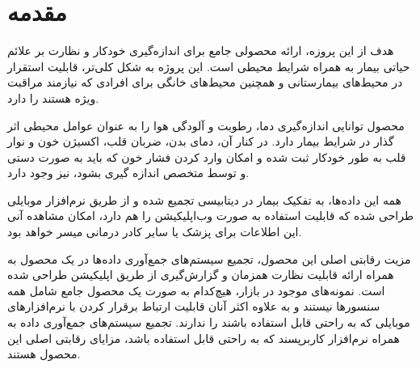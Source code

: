 \chapter{مقدمه}

هدف از این پروزه، ارائه محصولی جامع برای اندازه‌گیری خودکار و نظارت بر علائم حیاتی بیمار به همراه شرایط محیطی است. این پروژه به شکل کلی‌تر، قابلیت استقرار در محیط‌های بیمارستانی و همچنین محیط‌های خانگی برای افرادی که نیازمند مراقبت ویژه هستند را دارد.

محصول توانایی اندازه‌گیری دما،‌ رطوبت و آلودگی هوا را به عنوان عوامل محیطی اثر گذار در شرایط بیمار دارد. در کنار آن، دمای بدن، ضربان قلب، اکسیژن خون و نوار قلب به طور خودکار ثبت شده و امکان وارد کردن فشار خون که باید به صورت دستی و توسط متخصص اندازه گیری بشود، نیز وجود دارد.

همه این داده‌ها، به تفکیک بیمار در دیتابیسی تجمیع شده و از طریق نرم‌افزار موبایلی طراحی شده که قابلیت استفاده به صورت وب‌اپلیکیشن‌ را هم دارد، امکان مشاهده آنی این اطلاعات برای پزشک یا سایر کادر درمانی میسر خواهد بود.

مزیت رقابتی اصلی این محصول،‌ تجمیع سیستم‌های جمع‌آوری داده‌ها در یک محصول به همراه ارائه قابلیت نظارت همزمان و گزارش‌گیری از طریق اپلیکیشن طراحی شده است. نمونه‌های موجود در بازار، هیچ‌کدام به صورت یک محصول جامع شامل همه سنسورها نیستند و به علاوه اکثر آنان قابلیت ارتباط برقرار کردن با نرم‌افزارهای موبایلی که به راحتی قابل استفاده باشند را ندارند. تجمیع سیستم‌های جمع‌آوری داده به همراه نرم‌افزار کاربرپسند که به راحتی قابل استفاده باشد،‌ مزایای رقابتی اصلی این محصول هستند.

